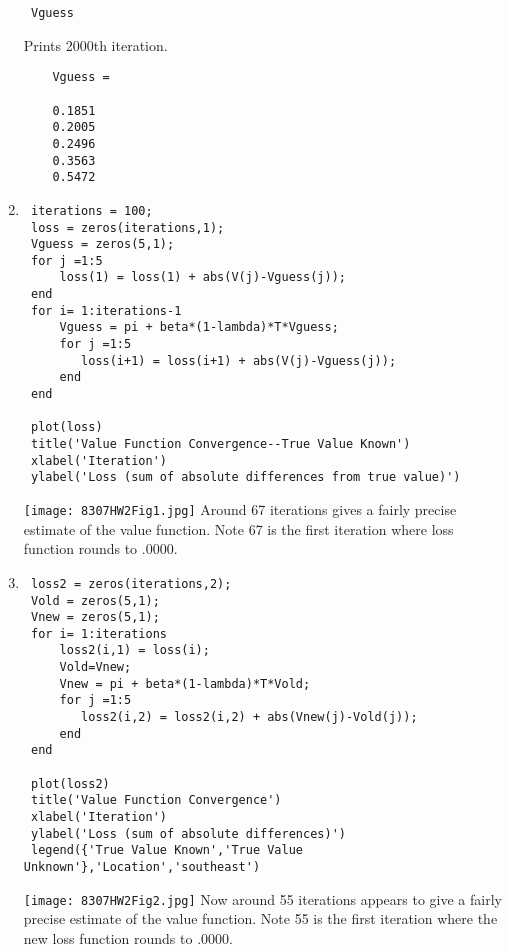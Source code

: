 \documentclass[12pt]{article}
\begin{document}
\begin{onehalfspace}
\begin{enumerate}[1.]
\begin{lstlisting}
 Vguess
	\end{lstlisting}
	Prints 2000th iteration.
	\begin{lstlisting}
	Vguess =

    0.1851
    0.2005
    0.2496
    0.3563
    0.5472
	\end{lstlisting}
	
	\item
	\begin{lstlisting}
 iterations = 100;
 loss = zeros(iterations,1);
 Vguess = zeros(5,1);
 for j =1:5
     loss(1) = loss(1) + abs(V(j)-Vguess(j));
 end
 for i= 1:iterations-1
     Vguess = pi + beta*(1-lambda)*T*Vguess;
     for j =1:5
        loss(i+1) = loss(i+1) + abs(V(j)-Vguess(j));
     end
 end
 
 plot(loss)
 title('Value Function Convergence--True Value Known')
 xlabel('Iteration')
 ylabel('Loss (sum of absolute differences from true value)')
	\end{lstlisting}
	\texttt{[image: 8307HW2Fig1.jpg]}
	Around 67 iterations gives a fairly precise estimate of the value function. Note 67 is the first iteration where loss function rounds to .0000.
 
	\item
	\begin{lstlisting}
 loss2 = zeros(iterations,2);
 Vold = zeros(5,1);
 Vnew = zeros(5,1);
 for i= 1:iterations
     loss2(i,1) = loss(i);
     Vold=Vnew;
     Vnew = pi + beta*(1-lambda)*T*Vold;
     for j =1:5
        loss2(i,2) = loss2(i,2) + abs(Vnew(j)-Vold(j));
     end
 end
 
 plot(loss2)
 title('Value Function Convergence')
 xlabel('Iteration')
 ylabel('Loss (sum of absolute differences)')
 legend({'True Value Known','True Value Unknown'},'Location','southeast')
	\end{lstlisting}
	\texttt{[image: 8307HW2Fig2.jpg]}
	Now around 55 iterations appears to give a fairly precise estimate of the value function. Note 55 is the first iteration where the new loss function rounds to .0000.
\end{enumerate}



\end{onehalfspace}
\end{document}
